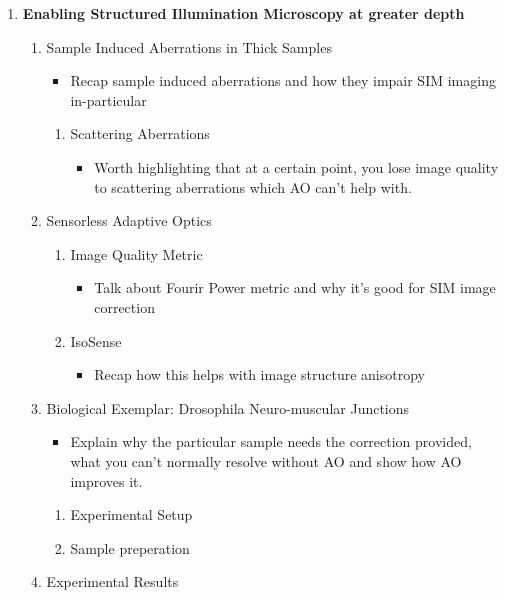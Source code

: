 \documentclass[twoside,onecolumn]{article}
\begin{document}
\begin{enumerate}[label*=\arabic*.]
	\item \textbf{Enabling Structured Illumination Microscopy at greater depth}
	\begin{enumerate}[label*=\arabic*.]
		\item Sample Induced Aberrations in Thick Samples
		\begin{itemize}
			\item Recap sample induced aberrations and how they impair SIM imaging in-particular
		\end{itemize}
		\begin{enumerate}[label*=\arabic*.]
			\item Scattering Aberrations
			\begin{itemize}
				\item Worth highlighting that at a certain point, you lose image quality to scattering aberrations which AO can't help with.
			\end{itemize}
		\end{enumerate}
		\item Sensorless Adaptive Optics
		\begin{enumerate}[label*=\arabic*.]
			\item Image Quality Metric
			\begin{itemize}
				\item Talk about Fourir Power metric and why it's good for SIM image correction
			\end{itemize}
			\item IsoSense
			\begin{itemize}
				\item Recap how this helps with image structure anisotropy
			\end{itemize}
		\end{enumerate}
		\item Biological Exemplar: Drosophila Neuro-muscular Junctions
		\begin{itemize}
			\item Explain why the particular sample needs the correction provided, what you can't normally resolve without AO and show how  AO improves it.
		\end{itemize}
		\begin{enumerate}[label*=\arabic*.]
			\item Experimental Setup
			\item Sample preperation
		\end{enumerate}
		\item Experimental Results
	\end{enumerate}


\end{enumerate}
\end{document}
